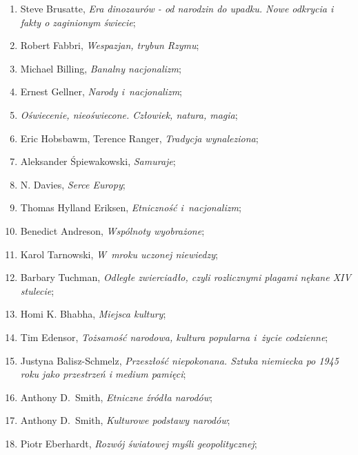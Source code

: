 \documentclass[a4paper,11pt]{article}
\begin{document}
\begin{enumerate}
\item Steve Brusatte, \emph{Era dinozaurów - od narodzin do upadku.
    Nowe odkrycia i fakty o zaginionym świecie};

\item Robert Fabbri, \emph{Wespazjan, trybun Rzymu};

\item Michael Billing, \emph{Banalny nacjonalizm};

\item Ernest Gellner, \emph{Narody i~nacjonalizm};

\item \emph{Oświecenie, nieoświecone. Człowiek, natura, magia};

\item Eric Hobsbawm, Terence Ranger, \emph{Tradycja wynaleziona};

\item Aleksander Śpiewakowski, \emph{Samuraje};

\item N. Davies, \emph{Serce Europy};

\item Thomas Hylland Eriksen, \emph{Etniczność i~nacjonalizm};

\item Benedict Andreson, \emph{Wspólnoty wyobrażone};

\item Karol Tarnowski, \emph{W~mroku uczonej niewiedzy};

\item Barbary Tuchman, \emph{Odległe zwierciadło, czyli rozlicznymi
    plagami nękane XIV stulecie};

\item Homi K. Bhabha, \emph{Miejsca kultury};

\item Tim Edensor, \emph{Tożsamość narodowa, kultura popularna i~życie
    codzienne};

\item Justyna Balisz-Schmelz, \emph{Przeszłość niepokonana. Sztuka
    niemiecka po 1945 roku jako przestrzeń i medium pamięci};

\item Anthony D.~Smith, \emph{Etniczne źródła narodów};

\item Anthony D.~Smith, \emph{Kulturowe podstawy narodów};

\item Piotr Eberhardt, \emph{Rozwój światowej myśli geopolitycznej};


\end{enumerate}
\end{document}
